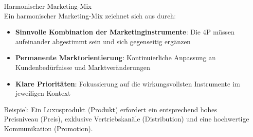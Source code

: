 \begin{concept}{Harmonischer Marketing-Mix}\\
Ein harmonischer Marketing-Mix zeichnet sich aus durch:
\begin{itemize}
    \item \textbf{Sinnvolle Kombination der Marketinginstrumente}: Die 4P müssen aufeinander abgestimmt sein und sich gegenseitig ergänzen
    \item \textbf{Permanente Marktorientierung}: Kontinuierliche Anpassung an Kundenbedürfnisse und Marktveränderungen
    \item \textbf{Klare Prioritäten}: Fokussierung auf die wirkungsvollsten Instrumente im jeweiligen Kontext
\end{itemize}

Beispiel: Ein Luxusprodukt (Produkt) erfordert ein entsprechend hohes Preisniveau (Preis), exklusive Vertriebskanäle (Distribution) und eine hochwertige Kommunikation (Promotion).
\end{concept}


